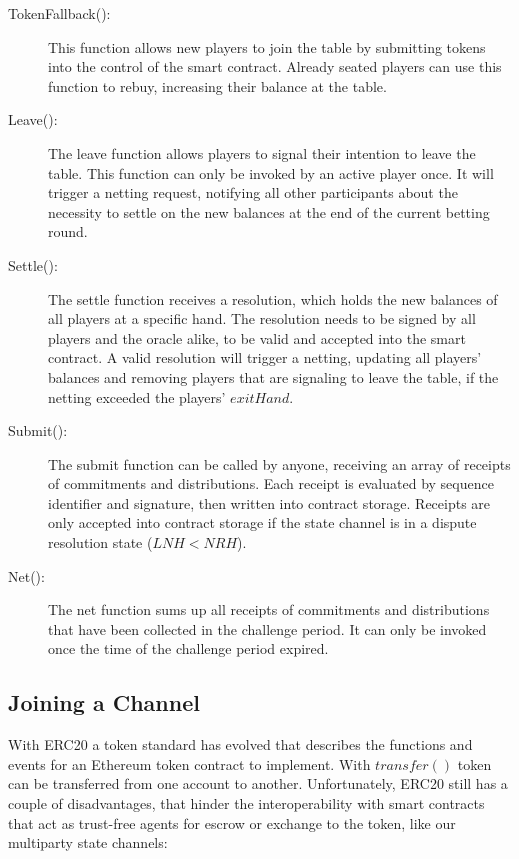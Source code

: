 \begin{description}
\item[TokenFallback():] This function allows new players to join the table by submitting tokens into the control of the smart contract. Already seated players can use this function to rebuy, increasing their balance at the table. 
\item[Leave():] The leave function allows players to signal their intention to leave the table. This function can only be invoked by an active player once. It will trigger a netting request, notifying all other participants about the necessity to settle on the new balances at the end of the current betting round.
\item[Settle():] The settle function receives a resolution, which holds the new balances of all players at a specific hand. The resolution needs to be signed by all players and the oracle alike, to be valid and accepted into the smart contract. A valid resolution will trigger a netting, updating all players' balances and removing players that are signaling to leave the table, if the netting exceeded the players' \(exitHand\).
\item[Submit():] The submit function can be called by anyone, receiving an array of receipts of commitments and distributions. Each receipt is evaluated by sequence identifier and signature, then written into contract storage. Receipts are only accepted into contract storage if the state channel is in a dispute resolution state (\(LNH < NRH\)).
\item[Net():] The net function sums up all receipts of commitments and distributions that have been collected in the challenge period. It can only be invoked once the time of the challenge period expired.
\end{description}



\subsection{Joining a Channel}

With ERC20 a token standard has evolved that describes the functions and events for an Ethereum token contract  to implement. With \(transfer()\) token can be transferred from one account to another. Unfortunately, ERC20 still has a couple of disadvantages, that hinder the interoperability with smart contracts that act as trust-free agents for escrow or exchange to the token, like our multiparty state channels:

